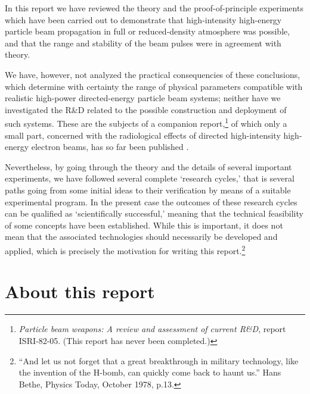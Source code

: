\documentclass [12pt,a4paper,     ]{report} %
\begin{document}
In this report we have reviewed the theory and the proof-of-principle experiments which have been carried out to demonstrate that high-intensity high-energy particle beam propagation in full or reduced-density atmosphere was possible, and that the range and stability of the beam pulses were in agreement with theory.

We have, however, not analyzed the practical consequencies of these conclusions, which determine with certainty the range of physical parameters compatible with realistic high-power directed-energy particle beam systems;  neither have we investigated the R\&D related to the possible construction and deployment of such systems. These are the subjects of a companion report,\footnote{\emph{Particle beam weapons: A review and assessment of current R\&D}, report ISRI-82-05.  (This report has never been completed.)} of which only a small part, concerned with the radiological effects of directed high-intensity high-energy electron beams, has so far been published \cite{GEER-1983-}.

Nevertheless, by going through the theory and the details of several important experiments, we have followed several complete `research cycles,' that is several paths going from some initial ideas to their verification by means of a suitable experimental program.  In the present case the outcomes of these research cycles can be qualified as `scientifically successful,' meaning that the technical feasibility of some concepts have been established.  While this is important, it does not mean that the associated technologies should necessarily be developed and applied, which is precisely the motivation for writing this report.\footnote{``And let us not forget that a great breakthrough in military technology, like the invention of the H-bomb, can quickly come back to haunt us.'' Hans Bethe, Physics Today, October 1978, p.13.}




\chapter{About this report}
\label{abo:0}
\end{document}
